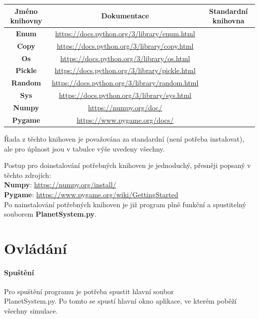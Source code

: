 \documentclass[a4paper, 12pt]{article}
\newcommand{\cmark}{\ding{51}}
\newcommand{\xmark}{\ding{55}}
\newcommand{\pgm}{PlanetSystem.py}
\begin{document}
\begin{table}[h!]
\centering
\hspace*{-1.5cm}
\begin{tabular}{ |c|c|c| }
 \hline
 Jméno knihovny & Dokumentace & Standardní knihovna\\
 \hline
 \textbf{Enum} & \url{https://docs.python.org/3/library/enum.html} & \cmark\\
 \hline
 \textbf{Copy} & \url{https://docs.python.org/3/library/copy.html} & \cmark\\
 \hline
 \textbf{Os} & \url{https://docs.python.org/3/library/os.html} & \cmark\\
 \hline
 \textbf{Pickle} & \url{https://docs.python.org/3/library/pickle.html} & \cmark\\
 \hline
 \textbf{Random} & \url{https://docs.python.org/3/library/random.html} & \cmark\\
 \hline
 \textbf{Sys} & \url{https://docs.python.org/3/library/sys.html} & \cmark\\
 \hline
 \textbf{Numpy} & \url{https://numpy.org/doc/} & \xmark\\
 \hline
 \textbf{Pygame} & \url{https://www.pygame.org/docs/} & \xmark\\
 \hline
\end{tabular}

\vspace{0.25cm}
\footnotesize{Řada z těchto knihoven je považována za standardní (není
potřeba instalovat), ale pro úplnost jsou v tabulce výše uvedeny všechny.}
\end{table}

\pagebreak
Postup pro doinstalování potřebných knihoven je jednoduchý, přesněji popsaný v
těchto zdrojích:\\
\textbf{Numpy}: \url{https://numpy.org/install/}\\
\textbf{Pygame}: \url{https://www.pygame.org/wiki/GettingStarted}\\

Po nainstalování potřebných knihoven je již program plně funkční a spustitelný
souborem \textbf{PlanetSystem.py}.

\section{Ovládání}
\paragraph{Spuštění}
Pro spuštění programu je potřeba spustit hlavní soubor \\\pgm. Po tomto se
spustí hlavní okno aplikace, ve kterém poběží všechny simulace.
\end{document}
